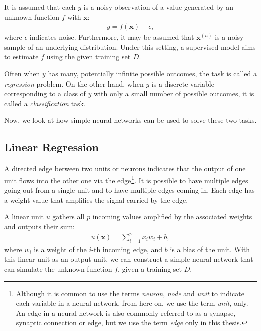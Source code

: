 \documentclass[dissertation,nocontribution,draft*]{aaltoseries}
\newcommand{\vect}[1]{\mathbf{#1}}
\newcommand{\vx}[0]{\vect{x}}
\begin{document}
It is assumed that each $y$ is a noisy observation of a
value generated by an unknown function $f$ with $\vx$:
\begin{align}
    \label{eq:linreg_gen}
    y = f(\vx) + \epsilon,
\end{align}
where $\epsilon$ indicates noise. Furthermore, it may be
assumed that $\vx^{(n)}$ is a noisy sample of an underlying
distribution.  Under this setting, a supervised model aims
to estimate $f$ using the given training set $D$.

Often when $y$ has many, potentially infinite possible
outcomes, the task is called a \textit{regression} problem.
On the other hand, when $y$ is a discrete variable 
corresponding to a class of $y$ with only a small number of
possible outcomes, it is called a \textit{classification}
task.

Now, we look at how simple neural networks can be used to
solve these two tasks.

\subsection{Linear Regression}
\label{sec:linear_regression}

A directed edge between two units or neurons indicates that
the output of one unit flows into the other one via the
edge\footnote{Although it is common to use the terms
\textit{neuron}, \textit{node} and \textit{unit} to indicate
each variable in a neural network, from here on, we use the
term \textit{unit}, only. An edge in a neural network is
also commonly referred to as a synapse, synaptic connection
or edge, but we use the term \textit{edge} only in this
thesis.}. It is possible to have multiple edges going out
from a single unit and to have multiple edges coming in.
Each edge has a weight value that amplifies the signal
carried by the edge.

A linear unit $u$ gathers all $p$ incoming values amplified
by the associated weights and outputs their sum:
\begin{align}
    \label{eq:linear_unit}
    u(\vx) = \sum_{i=1}^p x_i w_i + b, 
\end{align}
where $w_i$ is a weight of the $i$-th incoming edge, and $b$
is a bias of the unit.  With this linear unit as an output
unit, we can construct a simple neural network that can
simulate the unknown function $f$, given a training set $D$. 
\end{document}
